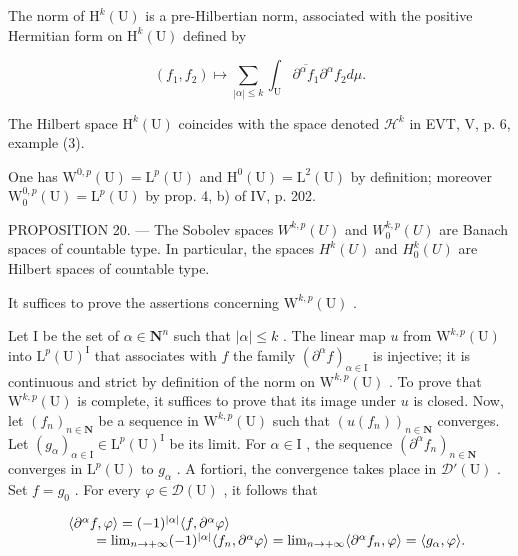 The norm of \(\mathrm{H}^{k}(\mathrm{U})\) is a pre-Hilbertian norm, associated with the positive Hermitian form on \(\mathrm{H}^{k}(\mathrm{U})\) defined by

\[
\left(f _ {1}, f _ {2}\right) \mapsto \sum_ {| \alpha | \leqslant k} \int_ {\mathrm{U}} \overline {{\partial^ {\alpha} f _ {1}}} \partial^ {\alpha} f _ {2} d \mu .
\]

The Hilbert space \(\mathrm{H}^k (\mathrm{U})\) coincides with the space denoted \(\mathcal{H}^k\) in EVT, V, p. 6, example (3).

One has \(\mathrm{W}^{0,p}(\mathrm{U})=\mathrm{L}^{p}(\mathrm{U})\) and \(\mathrm{H}^{0}(\mathrm{U})=\mathrm{L}^{2}(\mathrm{U})\) by definition; moreover \(\mathrm{W}_{0}^{0,p}(\mathrm{U})=\mathrm{L}^{p}(\mathrm{U})\) by prop. 4, b) of IV, p. 202.

PROPOSITION 20. — The Sobolev spaces \(W^{k,p}(U)\) and \(W_{0}^{k,p}(U)\) are Banach spaces of countable type. In particular, the spaces \(H^{k}(U)\) and \(H_{0}^{k}(U)\) are Hilbert spaces of countable type.

It suffices to prove the assertions concerning \(\mathrm{W}^{k,p}(\mathrm{U})\) .

Let I be the set of \(\alpha \in \mathbf{N}^n\) such that \(|\alpha| \leqslant k\) . The linear map \(u\) from \(\mathrm{W}^{k,p}(\mathrm{U})\) into \(\mathrm{L}^p (\mathrm{U})^{\mathrm{I}}\) that associates with \(f\) the family \((\partial^{\alpha}f)_{\alpha \in \mathrm{I}}\) is injective; it is continuous and strict by definition of the norm on \(\mathrm{W}^{k,p}(\mathrm{U})\) . To prove that \(\mathrm{W}^{k,p}(\mathrm{U})\) is complete, it suffices to prove that its image under \(u\) is closed. Now, let \((f_n)_{n \in \mathbf{N}}\) be a sequence in \(\mathrm{W}^{k,p}(\mathrm{U})\) such that \((u(f_n))_{n \in \mathbf{N}}\) converges. Let \((g_{\alpha})_{\alpha \in \mathrm{I}} \in \mathrm{L}^p (\mathrm{U})^{\mathrm{I}}\) be its limit. For \(\alpha \in \mathrm{I}\) , the sequence \((\partial^{\alpha}f_n)_{n \in \mathbf{N}}\) converges in \(\mathrm{L}^p (\mathrm{U})\) to \(g_{\alpha}\) . A fortiori, the convergence takes place in \(\mathcal{D}'(\mathrm{U})\) . Set \(f = g_0\) . For every \(\varphi \in \mathcal{D}(\mathrm{U})\) , it follows that

\[
\begin{array}{r l} & {\langle \partial^ {\alpha} f, \varphi \rangle = (- 1) ^ {| \alpha |} \langle f, \partial^ {\alpha} \varphi \rangle} \\ & {\qquad = \lim _ {n \to + \infty} (- 1) ^ {| \alpha |} \langle f _ {n}, \partial^ {\alpha} \varphi \rangle = \lim _ {n \to + \infty} \langle \partial^ {\alpha} f _ {n}, \varphi \rangle = \langle g _ {\alpha}, \varphi \rangle .} \end{array}
\]

